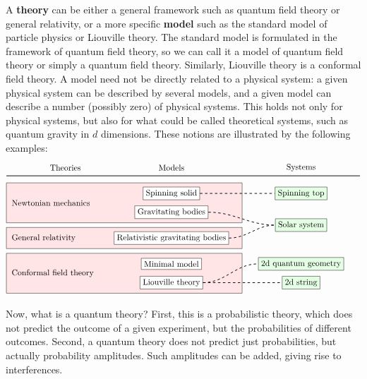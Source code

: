 \documentclass[12pt, a4paper, notitlepage, twoside]{report}
\numberwithin{equation}{section}
\theoremstyle{break}
\begin{document}
A \textbf{\boldmath theory} can be either a general framework such as quantum field theory or general relativity, or a more specific \textbf{\boldmath model} such as the standard model of particle physics or Liouville theory.
The standard model is formulated in the framework of quantum field theory, so we can call it a model of quantum field theory or simply a quantum field theory.
Similarly, Liouville theory is a conformal field theory.
A model need not be directly related to a physical system: a given physical system can be described by several models, and a given model can describe a number (possibly zero) of physical systems.
This holds not only for physical systems, but also for what could be called theoretical systems, such as quantum gravity in $d$ dimensions.
These notions are illustrated by the following examples:
\begin{align}
 \begin{tikzpicture}[scale = .5]
  \node at (5,11){Theories};
  \node at (14,11){Models};
  \node at (25,11){Systems};
  \draw[thick] (0,10.3) -- (30,10.3);
  \draw[fill = red!10] (0, 6.3) rectangle (20, 9.7);
  \draw[fill = red!10] (0, 4.1) rectangle (20, 5.9);
  \draw[fill = red!10] (0, .3) rectangle (20, 3.7);
  \node at (.2, 8)[right] {Newtonian mechanics};
  \node at (.2, 5)[right] {General relativity};
  \node at (.2, 2)[right] {Conformal field theory};
  \draw (14, 8.8) node[draw, fill = white] (ss) {Spinning solid};
  \draw (14, 7.2) node[draw, fill = white] (gb) {Gravitating bodies};
  \draw (14, 5) node[draw, fill = white] (rgb) {Relativistic gravitating bodies};
  \draw (14, 2.8) node[draw, fill = white] (mm) {Minimal model};
  \draw (14, 1.2) node[draw, fill = white] (lt) {Liouville theory};
  \draw (25, 8.8) node[draw, fill = green!10] (st) {Spinning top};
  \draw (25, 6.1) node[draw, fill = green!10] (ssys) {Solar system};
  \draw (25, 2.8) node[draw, fill = green!10] (qg) {2d quantum geometry};
  \draw (25, 1.2) node[draw, fill = green!10] (str) {2d string};
  \draw[thick, dashed] (ss.east) to [out = 0, in = 180] (st.west);
  \draw[thick, dashed] (gb.east) to [out = 0, in = 180] (ssys.west);
  \draw[thick, dashed] (rgb.east) to [out = 0, in = 180] (ssys.west);
  \draw[thick, dashed] (lt.east) to [out = 0, in = 180] (qg.west);
  \draw[thick, dashed] (lt.east) to [out = 0, in = 180] (str.west);
 \end{tikzpicture}
\end{align}

Now, what is a quantum theory? First, this is a probabilistic theory, which does not predict the outcome of a given experiment, but the probabilities of different outcomes.
Second, a quantum theory does not predict just probabilities, but actually probability amplitudes.
Such amplitudes can be added, giving rise to interferences. 
\end{document}
